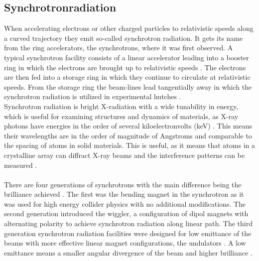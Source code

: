 \documentclass[10pt,a4paper, bibliography=totoc]{scrartcl}
\begin{document}
\subsection{Synchrotronradiation}
When accelerating electrons or other charged particles to relativistic speeds along a curved trajectory they emit so-called synchrotron radiation. It gets its name from the ring accelerators, the synchrotrons, where it was first observed. A typical synchrotron facility consists of a linear accelerator leading into a booster ring in which the electrons are brought up to relativistic speeds \cite{1}\cite{3}. The electrons are then fed into a storage ring in which they continue to circulate at relativistic speeds. From the storage ring the beam-lines lead tangentially away in which the synchrotron radiation is utilized in experimental hutches \cite{1}\cite{3}.\\
Synchrotron radiation is bright X-radiation with a wide tunability in energy, which is useful for examining structures and dynamics of materials, as X-ray photons have energies in the order of several kiloelectronvolts (keV) \cite{3}. This means their wavelengths are in the order of magnitude of Angstroms and comparable to the spacing of atoms in solid materials. This is useful, as it means that atoms in a crystalline array can diffract X-ray beams and the interference patterns can be measured \cite{1}.\\\\
There are four generations of synchrotrons with the main difference being the brilliance achieved \cite{1}. The first was the bending magnet in the synchrotron as it was used for high energy collider physics with no additional modifications. The second generation introduced the wiggler, a configuration of dipol magnets with alternating polarity to achieve synchrotron radiation along linear path. The third generation synchrotron radiation facilities were designed for low emittance of the beams with more effective linear magnet configurations, the undulators \cite{3}. A low emittance means a smaller angular divergence of the beam and higher brilliance \cite{3}.
\end{document}
